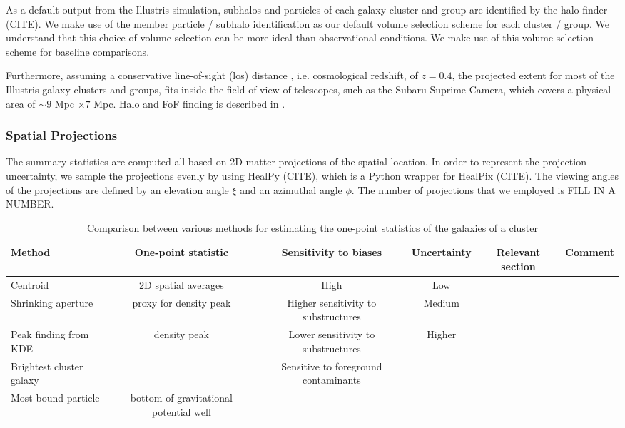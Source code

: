 As a default output from the Illustris simulation, subhalos and particles of
each galaxy cluster and group are identified by the halo finder
(CITE). We make use of the member particle / subhalo identification as our
default volume selection scheme for each cluster / group.
We understand that this choice of volume selection can be more ideal than
observational conditions. We make use of this volume selection scheme
for baseline comparisons. 

Furthermore, assuming a conservative line-of-sight (los) distance 
, i.e. cosmological redshift, of $z = 0.4$, 
the projected extent for most of the Illustris galaxy clusters and groups, 
fits inside the field of view of telescopes, such as the Subaru Suprime Camera,
which covers a physical area of $\sim 9$ Mpc $\times 7$ Mpc. 
Halo and FoF finding is described in \citep{Vogelsberger2014}.

\subsubsection{Spatial Projections}
The summary statistics are computed all based on 2D matter projections of the
spatial location.
In order to represent the projection uncertainty, we sample the projections evenly
by using HealPy (CITE), which is a Python wrapper for HealPix (CITE).
The viewing angles of the projections are defined by an elevation angle
$\xi$ and an azimuthal angle $\phi$. 
The number of projections that we employed is FILL IN A NUMBER.

\begin{table*}
\begin{center}
\begin{minipage}{180mm} 
	\caption{Comparison between various methods for estimating the one-point
		statistics of the galaxies of a cluster 
\label{tab:centroid_comparison}} 
	\begin{tabular}{@{}lccccc@{}}
\hline 
Method &  One-point statistic & Sensitivity to biases & Uncertainty  & Relevant
section & Comment  \\ \hline
Centroid & 2D spatial averages & High & Low & \\
Shrinking aperture & proxy for density peak & Higher sensitivity to substructures & Medium
& \\
Peak finding from KDE & density peak & Lower sensitivity to substructures &
Higher & \\
Brightest cluster galaxy & & Sensitive to foreground contaminants & \\ 
Most bound particle & bottom of gravitational potential well &  & 
&  \\
\hline
\end{tabular} 
\label{tab:summary_stat_info} 
\end{minipage}
\end{center} 
\end{table*}
